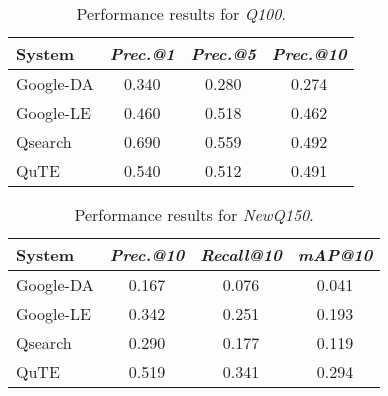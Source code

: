 \begin{table}[t]
  \caption{Performance results for \textit{Q100}.}
	\vspace{\tsq}
  \centering
  \begin{tabular}{l|ccc} \hline
 System & \textit{Prec.@1} & \textit{Prec.@5} & \textit{Prec.@10} \\ \hline
 Google-DA & 0.340 & 0.280 & 0.274 \\ 
 Google-LE & 0.460 & 0.518 & 0.462 \\ 
 Qsearch & 0.690 & 0.559 & 0.492 \\ 
 QuTE & 0.540 & 0.512 & 0.491  \\ \hline
 \end{tabular}
  \label{table:performance_Q100}
  
  \end{table}
\begin{table}[t]

  \caption{Performance results for \textit{NewQ150}.}
	\vspace{\tsq}
  \centering
  \begin{tabular}{l|ccc} \hline
System & \textit{Prec.@10} & \textit{Recall@10} & \textit{mAP@10} \\  \hline
    {Google-DA} & 0.167 & 0.076 & 0.041  \\ 
    {Google-LE} & 0.342 & 0.251 & 0.193 \\ 
    {Qsearch} & 0.290 & 0.177  & 0.119  \\ 
    {QuTE} & 0.519 & 0.341  & 0.294  \\  
    \hline
  \end{tabular}
  \label{table:performance_newQ150}
\end{table}
